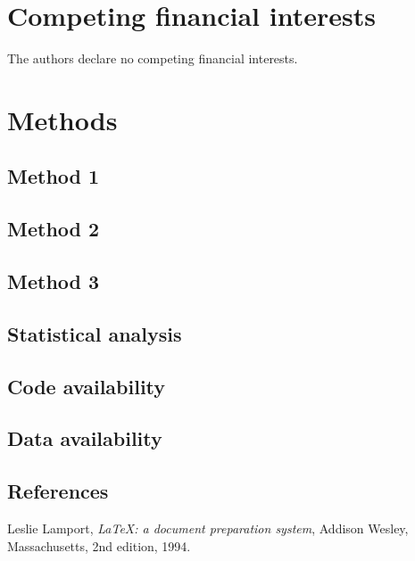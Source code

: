 \documentclass[twocolumn, linenumbers, superscriptaddress]{revtex4-1}
\begin{document}
	\section*{Competing financial interests}
		The authors declare no competing financial interests.
	
	\newpage

	\section*{Methods}
		\subsection*{Method 1}
			\blindtext[3]
			
		\subsection*{Method 2}
			\blindtext[3]
			
		\subsection*{Method 3}
			\blindtext[3]
			
		\subsection*{Statistical analysis}
			\blindtext[3]
			
		\subsection*{Code availability}
			\blindtext[3]
			
		\subsection*{Data availability}
			\blindtext[3]

	\begin{thebibliography}{50}
		\section*{References}	
			Leslie Lamport,
			\textit{\LaTeX: a document preparation system},
			Addison Wesley, Massachusetts,
			2nd edition,
			1994.

	\end{thebibliography}
\end{document}
